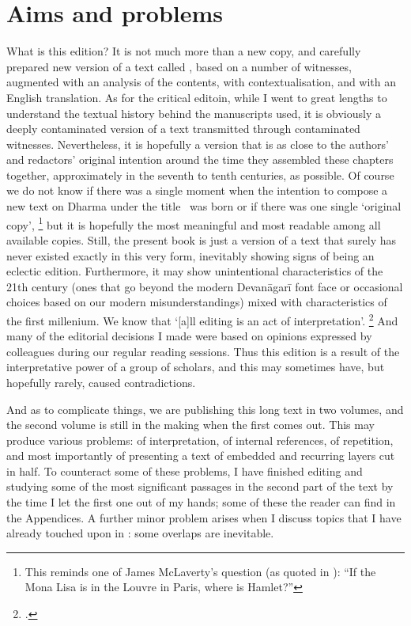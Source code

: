 \documentclass[11pt]{book}
\begin{document}

\vfill
\pagebreak




\section{Aims and problems}
\frenchspacing

\noindent
What is this edition? It is not much more than
 a new copy, and carefully prepared new version
of a text called \Vss, based on a number of witnesses,
augmented with an analysis of the contents, with
contextualisation, and with an English translation.
As for the critical editoin, while I went to great 
lengths to understand the textual history behind 
the manuscripts used, it is obviously a deeply contaminated 
version of a text transmitted through contaminated witnesses.
Nevertheless, it is hopefully a version that is as 
close to the authors' and redactors' original intention
around the time they assembled these chapters together, 
approximately in the seventh to tenth centuries, as possible. 
Of course we do not know if there was a single moment
when the intention to compose a new text on Dharma
under the title \Vss\ was born or if there was one single
`original copy',%
		\footnote{This reminds one of James McLaverty's
				         question (as quoted in 
   				        ):
				``If the Mona Lisa is in the Louvre in Paris, where is Hamlet?''}
but it is hopefully the most meaningful and most readable
among all available copies. Still, the present book is just a
version of a text that surely has never existed exactly 
in this very form, inevitably showing
signs of being an eclectic edition. 
Furthermore, it may show unintentional 
characteristics of the 21th century 
(ones that go beyond the modern Devanāgarī font face
or occasional choices based on our modern misunderstandings) 
mixed with characteristics of the first millenium. 
We know that `[a]ll editing is an act of interpretation'.%
		\footnote{.}
And many of the editorial decisions I made were based
on opinions expressed by colleagues during our
regular reading sessions. Thus this edition is a result
of the interpretative power of a group of scholars, and
this may sometimes have, but hopefully rarely, caused contradictions.

And as to complicate things, we are publishing this long text
in two volumes, and the second volume is still in the making
when the first comes out. This may produce various problems:
of interpretation, of internal references, of repetition, 
and most importantly of presenting a text of
embedded and recurring layers cut in half. To counteract
some of these problems, I have finished editing and 
studying some of the most significant passages in 
the second part of the text by the time I let the first one
out of my hands; some of these the reader can find in 
the Appendices. A further minor problem arises when
I discuss topics that I have already touched upon in : some overlaps are inevitable.
\end{document}
